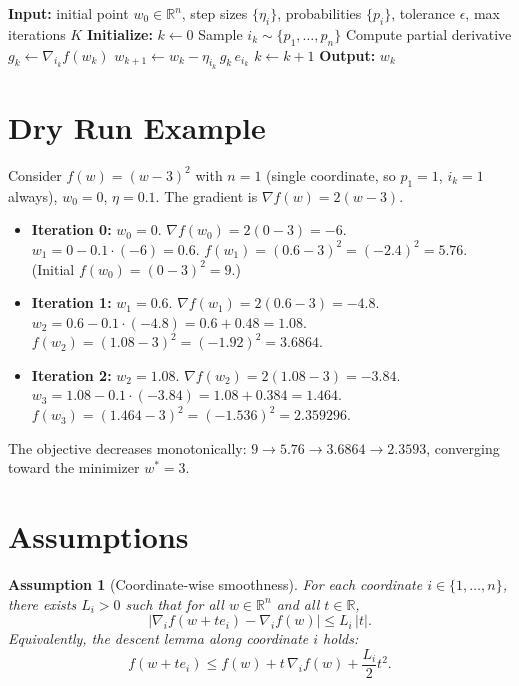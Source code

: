 \documentclass{article}
\newtheorem{assumption}{Assumption}
\begin{document}
\begin{algorithm}[h]
\caption{Randomized Coordinate Descent (RCD)}
\begin{algorithmic}[1]
\State \textbf{Input:} initial point $w_0 \in \mathbb{R}^n$, step sizes $\{\eta_i\}$,
probabilities $\{p_i\}$, tolerance $\epsilon$, max iterations $K$
\State \textbf{Initialize:} $k \gets 0$
    \State Sample $i_k \sim \{p_1, \dots, p_n\}$
    \State Compute partial derivative $g_k \gets \nabla_{i_k} f(w_k)$
    \State $w_{k+1} \gets w_k - \eta_{i_k}\, g_k\, e_{i_k}$
    \State $k \gets k + 1$
\EndWhile
\State \textbf{Output:} $w_k$
\end{algorithmic}
\end{algorithm}

\section*{Dry Run Example}

Consider $f(w) = (w-3)^2$ with $n=1$ (single coordinate, so $p_1 = 1$, $i_k = 1$
always), $w_0 = 0$, $\eta = 0.1$. The gradient is $\nabla f(w) = 2(w-3)$.

\begin{itemize}
\item \textbf{Iteration 0:} $w_0 = 0$.
$\nabla f(w_0) = 2(0-3) = -6$.
$w_1 = 0 - 0.1 \cdot (-6) = 0.6$.
$f(w_1) = (0.6 - 3)^2 = (-2.4)^2 = 5.76$.
(Initial $f(w_0) = (0-3)^2 = 9$.)

\item \textbf{Iteration 1:} $w_1 = 0.6$.
$\nabla f(w_1) = 2(0.6-3) = -4.8$.
$w_2 = 0.6 - 0.1 \cdot (-4.8) = 0.6 + 0.48 = 1.08$.
$f(w_2) = (1.08 - 3)^2 = (-1.92)^2 = 3.6864$.

\item \textbf{Iteration 2:} $w_2 = 1.08$.
$\nabla f(w_2) = 2(1.08-3) = -3.84$.
$w_3 = 1.08 - 0.1 \cdot (-3.84) = 1.08 + 0.384 = 1.464$.
$f(w_3) = (1.464 - 3)^2 = (-1.536)^2 = 2.359296$.
\end{itemize}

The objective decreases monotonically: $9 \to 5.76 \to 3.6864 \to 2.3593$,
converging toward the minimizer $w^* = 3$.

\section*{Assumptions}

\begin{assumption}[Coordinate-wise smoothness]
\label{ass:smooth}
For each coordinate $i \in \{1,\dots,n\}$, there exists $L_i > 0$ such that for all
$w \in \mathbb{R}^n$ and all $t \in \mathbb{R}$,
\[
\big| \nabla_i f(w + t e_i) - \nabla_i f(w) \big| \le L_i\, |t|.
\]
Equivalently, the descent lemma along coordinate $i$ holds:
\[
f(w + t e_i) \le f(w) + t\, \nabla_i f(w) + \frac{L_i}{2} t^2 .
\]
\end{assumption}
\end{document}
